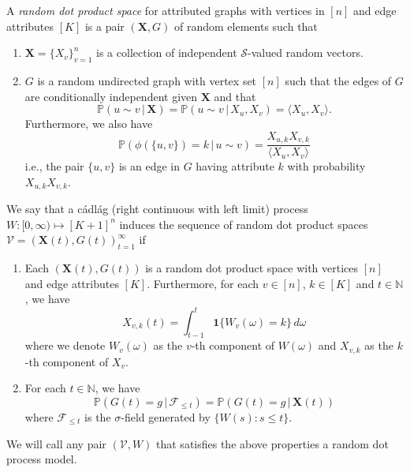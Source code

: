 \documentclass[10pt,draftclsnofoot,onecolumn]{IEEEtran}
\theoremstyle{definition}
\begin{document}
A {\em random dot product space} for attributed graphs with vertices
in $[n]$ and edge attributes $[K]$ is a pair $(\mathbf{X},G)$ of
random elements such that
\begin{enumerate}
\item $\mathbf{X} = \{X_v\}_{v = 1}^{n}$ is a collection of
  independent $\mathscr{S}$-valued random vectors.
\item $G$ is a random undirected graph with vertex set $[n]$ such
  that the edges of $G$ are conditionally independent given
  $\mathbf{X}$ and that
  \begin{equation}
    \label{eq:1}
    \mathbb{P}(u \sim v \,|\, \mathbf{X}) = \mathbb{P}(u \sim v \, |
    \, X_u,X_v) = \langle X_u, X_v \rangle.
  \end{equation}
 Furthermore, we also have 
  \begin{equation}
    \label{eq:11}
    \mathbb{P}(\phi(\{u,v\}) = k \, | \, u \sim
    v) = \frac{X_{u,k} X_{v,k}}{\langle X_u, X_v \rangle}
  \end{equation}
  i.e., the pair $\{u,v\}$ is an edge in $G$ having attribute $k$ with
  probability $X_{u,k} X_{v,k}$.  
\end{enumerate}
We say that a c\'{a}dl\'{a}g (right continuous with left limit)
process $W \colon [0,\infty) \mapsto [K+1]^{n}$ induces the sequence
of random dot product spaces $\mathscr{V} = (\mathbf{X}(t), G(t))_{t =
1}^{\infty}$ if
\begin{enumerate}
\item Each $(\mathbf{X}(t), G(t))$ is a random dot product space with
  vertices $[n]$ and edge attributes $[K]$. Furthermore, for each $v
  \in [n]$, $k \in [K]$ and $t \in \mathbb{N}$, we have
  \begin{equation}
    \label{eq:54}
  X_{v,k}(t)  = \int_{t - 1}^{t}{ \mathbf{1}\{W_v(\omega) = k\}\, d\omega}
  \end{equation}
  where we denote $W_{v}(\omega)$ as the $v$-th component of $W(\omega)$ and
  $X_{v,k}$ as the $k$-th component of $X_v$.  
\item  For each $t \in \mathbb{N}$, we have
  \begin{equation}
    \label{eq:2}
    \mathbb{P}(G(t) = g \,|\, \mathscr{F}_{\leq t}) = \mathbb{P}(G(t)
    = g \,|\, \mathbf{X}(t))
  \end{equation}
where $\mathscr{F}_{\leq t}$ is the $\sigma$-field generated by $\{W(s)
  \colon s \leq t\}$.
\end{enumerate}
We will call any pair $(\mathscr{V}, W)$ that satisfies the above
properties a random dot process model.
\end{document}
